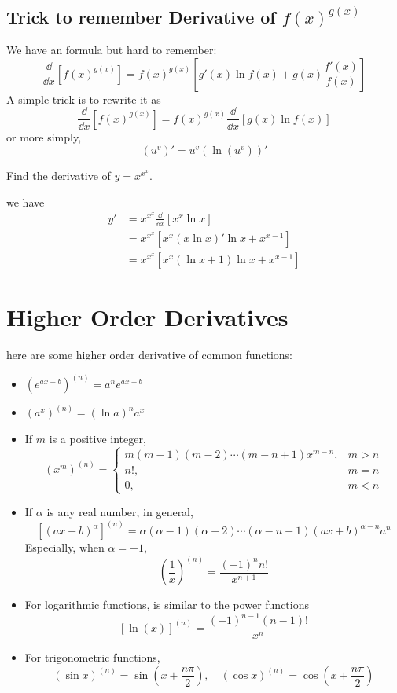\documentclass{overview}
\begin{document}
\subsection{Trick to remember Derivative of $f(x)^{g(x)}$ }
We have an formula but hard to remember:
\[
	\frac{\dd}{\dd x} \left[ f(x)^{g(x)} \right] =
	f(x)^{g(x)} \left[ g'(x) \ln f(x) + g(x) \frac{f'(x)}{f(x)} \right]
\] 
A simple trick is to rewrite it as
\[
	\frac{\dd}{\dd x} \left[ f(x)^{g(x)} \right] =
	f(x)^{g(x)} \frac{\dd}{\dd x} \left[ g(x) \ln f(x) \right]
\] 
or more simply,
\[
	(u^{v})' = u^{v} (\ln(u^{v}))'
\] 
\begin{example}
	Find the derivative of $y = x^{x^x}$.
	\begin{answer}
		we have
		\[
		\begin{aligned}
			y' &= x^{x^x} \frac{\dd}{\dd x} \left[ x^x \ln x \right] \\
				 &= x^{x^x} \left[ x^x (x\ln x)'\ln x + x^{x-1} \right] \\
				 &= x^{x^x} \left[ x^x (\ln x + 1) \ln x + x^{x-1} \right]
		\end{aligned}
		\]
	\end{answer}
\end{example}

\section{Higher Order Derivatives}

here are some higher order derivative of common functions:

\begin{itemize}
	\item $(e^{ax+b})^{(n)} = a^{n} e^{ax+b}$
	\item $(a ^{x})^{(n)} = (\ln a)^{n} a^{x}$
	\item If $m$ is a positive integer,
		 \[
			 (x^m)^{(n)} = \begin{cases}
				 m(m-1)(m-2)\cdots(m-n+1)x^{m-n}, & m > n\\
				 n! , & m = n \\
				 0, & m < n
			 \end{cases}
		\] 
	\item If $\alpha$ is any real number, in general,
		 \[
			 [(ax + b)^{\alpha}]^{(n)} = \alpha(\alpha - 1)(\alpha - 2)\cdots
			 (\alpha - n + 1)(ax + b)^{\alpha - n}a^{n}
		\]
		Especially, when $\alpha = -1$,
		 \[
			 \left( \frac{1}{x} \right)^{(n)} =
			 \frac{(-1)^{n} n!}{x^{n+1}}
		\] 
	\item For logarithmic functions, is similar to the power functions
		\[
		[\ln(x)]^{(n)} = \dfrac{(-1)^{n-1}(n-1)!}{x^{n}}
		\] 
	\item For trigonometric functions,
		\[
		(\sin x)^{(n)} = \sin\left( x + \frac{n\pi}{2} \right), \quad
		(\cos x)^{(n)} = \cos\left( x + \frac{n\pi}{2} \right)
		\]
\end{itemize}
\end{document}
